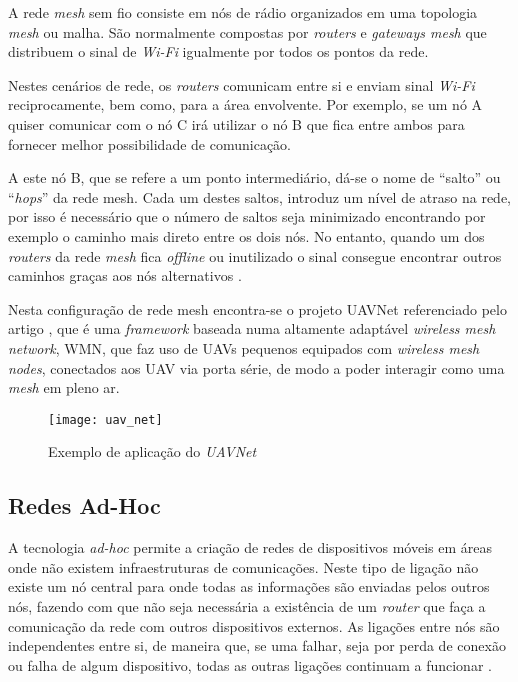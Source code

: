 A rede \textit{mesh} sem fio consiste em nós de rádio organizados em uma topologia \textit{mesh} ou malha. São normalmente compostas por \textit{routers} e \textit{gateways mesh} que distribuem o sinal de \textit{Wi-Fi} igualmente por todos os pontos da rede.

Nestes cenários de rede, os \textit{routers} comunicam entre si e enviam sinal \textit{Wi-Fi} reciprocamente, bem como, para a área envolvente. Por exemplo, se um nó A quiser comunicar com o nó C irá utilizar o nó B que fica entre ambos para fornecer melhor possibilidade de comunicação. 

A este nó B, que se refere a um ponto intermediário, dá-se o nome de “salto” ou “\textit{hops}” da rede mesh. Cada um destes saltos, introduz um nível de atraso na rede, por isso é necessário que o número de saltos seja minimizado encontrando por exemplo o caminho mais direto entre os dois nós. No entanto, quando um dos \textit{routers} da rede \textit{mesh} fica \textit{offline} ou inutilizado o sinal consegue encontrar outros caminhos graças aos nós alternativos \cite{NetSpot}.

Nesta configuração de rede mesh encontra-se o projeto UAVNet referenciado pelo artigo \cite{Morgenthaler2012a}, que é uma \textit{framework} baseada numa altamente adaptável \textit{wireless mesh network}, WMN, que faz uso de UAVs pequenos equipados com \textit{wireless mesh nodes}, conectados aos UAV via porta série, de modo a poder interagir como uma \textit{mesh} em pleno ar.

\begin{figure}[H]
\centering
\texttt{[image: uav\_net]}
\caption{Exemplo de aplicação do \textit{UAVNet} \label{fig:uav_net} }\cite{Morgenthaler2012a}
\end{figure}

\subsection{Redes Ad-Hoc}

A tecnologia \textit{ad-hoc} permite a criação de redes de dispositivos móveis em áreas onde não existem infraestruturas de comunicações. Neste tipo de ligação não existe um nó central para onde todas as informações são enviadas pelos outros nós, fazendo com que não seja necessária a existência de um \textit{router} que faça a comunicação da rede com outros dispositivos externos. As ligações entre nós são independentes entre si, de maneira que, se uma falhar, seja por perda de conexão ou falha de algum dispositivo, todas as outras ligações continuam a funcionar \cite{DalloraMoraes2007}.

